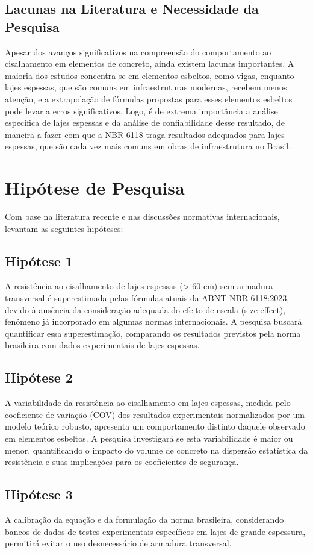 \section{Lacunas na Literatura e Necessidade da Pesquisa}
Apesar dos avanços significativos na compreensão do comportamento ao cisalhamento em elementos de concreto, ainda existem lacunas importantes. A maioria dos estudos concentra-se em elementos esbeltos, como vigas, enquanto lajes espessas, que são comuns em infraestruturas modernas, recebem menos atenção, e a extrapolação de fórmulas propostas para esses elementos esbeltos pode levar a erros significativos. Logo, é de extrema importância a análise específica de lajes espessas e da análise de confiabilidade desse resultado, de maneira a fazer com que a NBR 6118 traga resultados adequados para lajes espessas, que são cada vez mais comuns em obras de infraestrutura no Brasil.


\chapter{Hipótese de Pesquisa}
Com base na literatura recente e nas discussões normativas internacionais, levantam as seguintes hipóteses:

\section{Hipótese 1}
A resistência ao cisalhamento de lajes espessas (> 60 cm) sem armadura transversal é superestimada pelas fórmulas atuais da ABNT NBR 6118:2023, devido à ausência da consideração adequada do efeito de escala (size effect), fenômeno já incorporado em algumas normas internacionais. A pesquisa buscará quantificar essa superestimação, comparando os resultados previstos pela norma brasileira com dados experimentais de lajes espessas.
\section{Hipótese 2}
A variabilidade da resistência ao cisalhamento em lajes espessas, medida pelo coeficiente de variação (COV) dos resultados experimentais normalizados por um modelo teórico robusto, apresenta um comportamento distinto daquele observado em elementos esbeltos. A pesquisa investigará se esta variabilidade é maior ou menor, quantificando o impacto do volume de concreto na dispersão estatística da resistência e suas implicações para os coeficientes de segurança.
\section{Hipótese 3}
A calibração da equação e da formulação da norma brasileira, considerando bancos de dados de testes experimentais específicos em lajes de grande espessura, permitirá evitar o uso desnecessário de armadura transversal.


